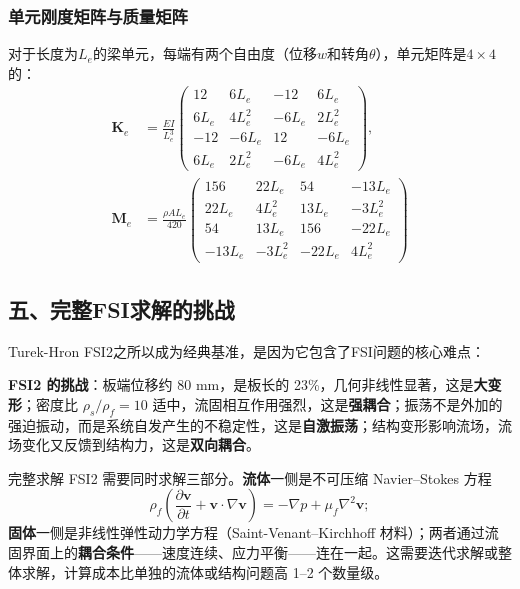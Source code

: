 \subsubsection*{单元刚度矩阵与质量矩阵}

对于长度为$L_e$的梁单元，每端有两个自由度（位移$w$和转角$\theta$），单元矩阵是$4 \times 4$的：
\begin{align}
\mathbf{K}_e &= \frac{EI}{L_e^3}
\begin{pmatrix}
12 & 6L_e & -12 & 6L_e \\
6L_e & 4L_e^2 & -6L_e & 2L_e^2 \\
-12 & -6L_e & 12 & -6L_e \\
6L_e & 2L_e^2 & -6L_e & 4L_e^2
\end{pmatrix}, \\
\mathbf{M}_e &= \frac{\rho A L_e}{420}
\begin{pmatrix}
156 & 22L_e & 54 & -13L_e \\
22L_e & 4L_e^2 & 13L_e & -3L_e^2 \\
54 & 13L_e & 156 & -22L_e \\
-13L_e & -3L_e^2 & -22L_e & 4L_e^2
\end{pmatrix}
\end{align}


\subsection*{五、完整FSI求解的挑战}

Turek-Hron FSI2之所以成为经典基准，是因为它包含了FSI问题的核心难点：

\begin{insightbox}
\textbf{FSI2 的挑战}：板端位移约 80 mm，是板长的 23\%，几何非线性显著，这是\textbf{大变形}；密度比 $\rho_s/\rho_f = 10$ 适中，流固相互作用强烈，这是\textbf{强耦合}；振荡不是外加的强迫振动，而是系统自发产生的不稳定性，这是\textbf{自激振荡}；结构变形影响流场，流场变化又反馈到结构力，这是\textbf{双向耦合}。
\end{insightbox}

完整求解 FSI2 需要同时求解三部分。\textbf{流体}一侧是不可压缩 Navier--Stokes 方程
\begin{equation}
\rho_f \left( \frac{\partial \mathbf{v}}{\partial t} + \mathbf{v} \cdot \nabla \mathbf{v} \right) = -\nabla p + \mu_f \nabla^2 \mathbf{v} ;
\end{equation}
\textbf{固体}一侧是非线性弹性动力学方程（Saint-Venant--Kirchhoff 材料）；两者通过流固界面上的\textbf{耦合条件}——速度连续、应力平衡——连在一起。这需要迭代求解或整体求解，计算成本比单独的流体或结构问题高 1--2 个数量级。

